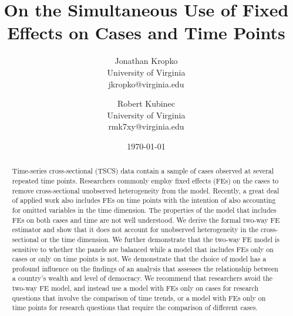 \documentclass{article}[12pt]
\begin{document}
\title{On the Simultaneous Use of Fixed Effects on Cases and Time Points}
\date{\today}
\author{Jonathan Kropko\\ University of Virginia \\ jkropko@virginia.edu \and Robert Kubinec \\University of Virginia\\rmk7xy@virginia.edu}
\maketitle
\begin{abstract}
Time-series cross-sectional (TSCS) data contain a sample of cases observed at several repeated time points.  Researchers commonly employ fixed effects (FEs) on the cases to remove cross-sectional unobserved heterogeneity from the model.  Recently, a great deal of applied work also includes FEs on time points with the intention of also accounting for omitted variables in the time dimension.  The properties of the model that includes FEs on both cases and time are not well understood.  We derive the formal two-way FE estimator and show that it does not account for unobserved heterogeneity in the cross-sectional or the time dimension.  We further demonstrate that the two-way FE model is sensitive to whether the panels are balanced while a model that includes FEs only on cases or only on time points is not.  We demonstrate that the choice of model has a profound influence on the findings of an analysis that assesses the relationship between a country's wealth and level of democracy.  We recommend that researchers avoid the two-way FE model, and instead use a model with FEs only on cases for research questions that involve the comparison of time trends, or a model with FEs only on time points for research questions that require the comparison of different cases. 
\end{abstract}
\end{document}
